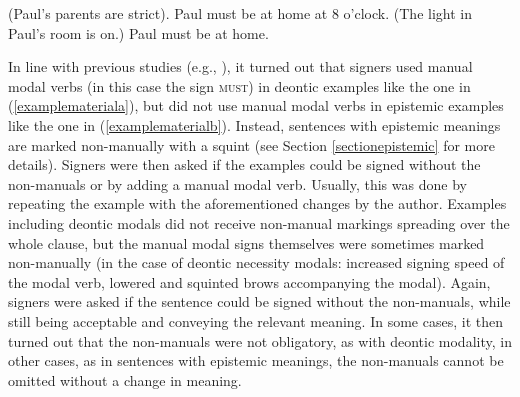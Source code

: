 \begin{exe}
\ex\label{examplematerial}\begin{xlist}
\ex (Paul's parents are strict). Paul must be at home at 8 o'clock. \label{examplemateriala}
\ex (The light in Paul's room is on.) Paul must be at home. \label{examplematerialb}
\end{xlist}
\end{exe}

\noindent In line with previous studies (e.g., \citealt{herrmann2013modal}), it turned out that signers used manual modal verbs (in this case the sign \textsc{must}) in deontic examples like the one in (\ref{examplemateriala}), but did not use manual modal verbs in epistemic examples like the one in (\ref{examplematerialb}). Instead, sentences with epistemic meanings are marked non-manually with a squint (see Section \ref{sectionepistemic} for more details). Signers were then asked if the examples could be signed without the non-manuals or by adding a manual modal verb. Usually, this was done by repeating the example with the aforementioned changes by the author. Examples including deontic modals did not receive non-manual markings spreading over the whole clause, but the manual modal signs themselves were sometimes marked non-manually (in the case of deontic necessity modals: increased signing speed of the modal verb, lowered and squinted brows accompanying the modal). Again, signers were asked if the sentence could be signed without the non-manuals, while still being acceptable and conveying the relevant meaning. In some cases, it then turned out that the non-manuals were not obligatory, as with deontic modality, in other cases, as in sentences with epistemic meanings, the non-manuals cannot be omitted without a change in meaning. 

